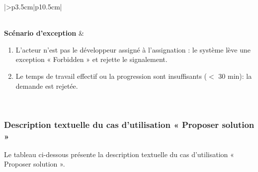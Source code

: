 \begin{longtable}{|>{}p{3.5cm}|p{10.5cm}|}
\begin{minipage}[t]{\linewidth}
\end{minipage} \\
\hline
\textbf{Scénario d'exception} &
\begin{minipage}[t]{\linewidth}\raggedright
\begin{enumerate}[label=E\arabic*., nosep,leftmargin=0.6cm,topsep=0pt,itemsep=1pt,series=scen_auth]
\item L’acteur n’est pas le développeur assigné à l’assignation : le système lève une exception « Forbidden » et rejette le signalement.
\item Le temps de travail effectif ou la progression sont insuffisants ($<$ 30 min): la demande est rejetée.
\end{enumerate}
\vspace{0.1cm}
\end{minipage} \\

\hline
\end{longtable}
\normalsize


\subsubsection{Description textuelle du cas d’utilisation « Proposer solution »}
Le tableau ci-dessous présente la description textuelle du cas d’utilisation « Proposer solution ».

